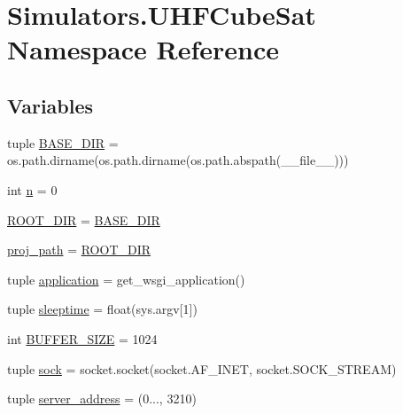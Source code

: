 \hypertarget{namespace_simulators_1_1_u_h_f_cube_sat}{}\section{Simulators.\+U\+H\+F\+Cube\+Sat Namespace Reference}
\label{namespace_simulators_1_1_u_h_f_cube_sat}
\subsection*{Variables}
\begin{DoxyCompactItemize}
\item 
tuple \hyperlink{namespace_simulators_1_1_u_h_f_cube_sat_adbbdaf55e4b09200f0e32d3e49e6fbec}{B\+A\+S\+E\+\_\+\+D\+I\+R} = os.\+path.\+dirname(os.\+path.\+dirname(os.\+path.\+abspath(\+\_\+\+\_\+file\+\_\+\+\_\+)))
\item 
int \hyperlink{namespace_simulators_1_1_u_h_f_cube_sat_aa8de796a9f89196f896ed5855b3a8ce4}{n} = 0
\item 
\hyperlink{namespace_simulators_1_1_u_h_f_cube_sat_ae324f329fb5abe42b2d8bf2faad07d2a}{R\+O\+O\+T\+\_\+\+D\+I\+R} = \hyperlink{namespace_simulators_1_1_u_h_f_cube_sat_adbbdaf55e4b09200f0e32d3e49e6fbec}{B\+A\+S\+E\+\_\+\+D\+I\+R}
\item 
\hyperlink{namespace_simulators_1_1_u_h_f_cube_sat_a8061636f761f08164b8ca45c2ef477a8}{proj\+\_\+path} = \hyperlink{namespace_simulators_1_1_u_h_f_cube_sat_ae324f329fb5abe42b2d8bf2faad07d2a}{R\+O\+O\+T\+\_\+\+D\+I\+R}
\item 
tuple \hyperlink{namespace_simulators_1_1_u_h_f_cube_sat_adc9e972abbe8f23136884aa756f61bb4}{application} = get\+\_\+wsgi\+\_\+application()
\item 
tuple \hyperlink{namespace_simulators_1_1_u_h_f_cube_sat_ab0affb04a9081bd0b75db4400d92fa2e}{sleeptime} = float(sys.\+argv\mbox{[}1\mbox{]})
\item 
int \hyperlink{namespace_simulators_1_1_u_h_f_cube_sat_a77fb75361e519e64f660c4da5cca3a8d}{B\+U\+F\+F\+E\+R\+\_\+\+S\+I\+Z\+E} = 1024
\item 
tuple \hyperlink{namespace_simulators_1_1_u_h_f_cube_sat_a51949a5e2f40cd214346438690e6ccfc}{sock} = socket.\+socket(socket.\+A\+F\+\_\+\+I\+N\+E\+T, socket.\+S\+O\+C\+K\+\_\+\+S\+T\+R\+E\+A\+M)
\item 
tuple \hyperlink{namespace_simulators_1_1_u_h_f_cube_sat_abb8434d05f5893653d27801880fa167d}{server\+\_\+address} = (\textquotesingle{}0...\textquotesingle{}, 3210)

\end{DoxyCompactItemize}
